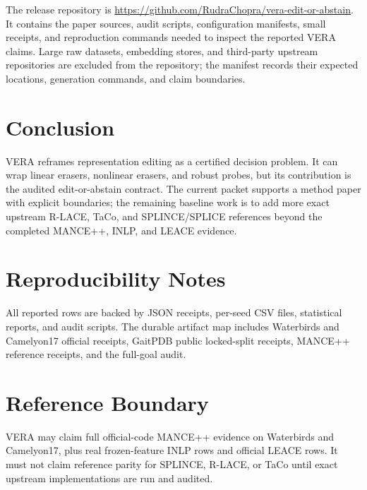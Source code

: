 \documentclass[10pt,twocolumn]{article}
\begin{document}
The release repository is
\url{https://github.com/RudraChopra/vera-edit-or-abstain}. It contains the
paper sources, audit scripts, configuration manifests, small receipts, and
reproduction commands needed to inspect the reported VERA claims. Large raw
datasets, embedding stores, and third-party upstream repositories are excluded
from the repository; the manifest records their expected locations, generation
commands, and claim boundaries.

\section{Conclusion}

VERA reframes representation editing as a certified decision problem. It can
wrap linear erasers, nonlinear erasers, and robust probes, but its contribution
is the audited edit-or-abstain contract. The current packet supports a method
paper with explicit boundaries; the remaining baseline work is to add more
exact upstream R-LACE, TaCo, and SPLINCE/SPLICE references beyond the completed
MANCE++, INLP, and LEACE evidence.

\appendix

\section{Reproducibility Notes}

All reported rows are backed by JSON receipts, per-seed CSV files, statistical
reports, and audit scripts. The durable artifact map includes Waterbirds and
Camelyon17 official receipts, GaitPDB public locked-split receipts, MANCE++
reference receipts, and the full-goal audit.

\section{Reference Boundary}

VERA may claim full official-code MANCE++ evidence on Waterbirds and
Camelyon17, plus real frozen-feature INLP rows and official LEACE rows. It must
not claim reference parity for SPLINCE, R-LACE, or TaCo until exact upstream
implementations are run and audited.
\end{document}
